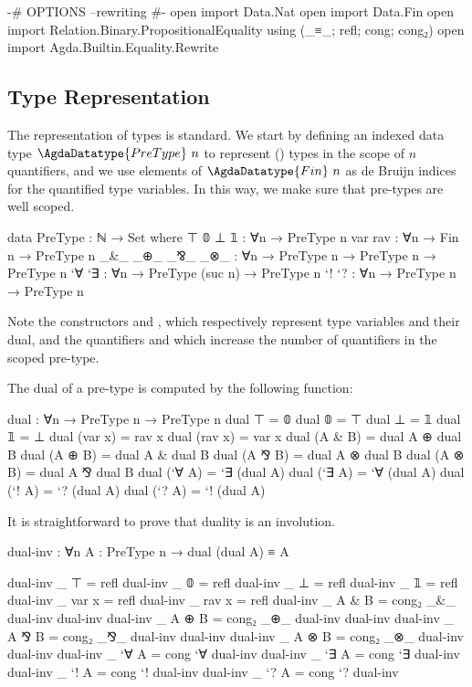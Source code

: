 \begin{code}[hide]
{-# OPTIONS --rewriting #-}
open import Data.Nat
open import Data.Fin
open import Relation.Binary.PropositionalEquality using (_≡_; refl; cong; cong₂)
open import Agda.Builtin.Equality.Rewrite
\end{code}

\subsection{Type Representation}
\label{sec:type-agda}

The representation of types is standard. We start by defining an indexed data
type $\AgdaDatatype{PreType}~n$ to represent (\LCC) types in the scope of $n$
quantifiers, and we use elements of $\AgdaDatatype{Fin}~n$ as de Bruijn indices
for the quantified type variables. In this way, we make sure that pre-types are
well scoped.

\begin{code}
data PreType : ℕ → Set where
  ⊤ 𝟘 ⊥ 𝟙          : ∀{n} → PreType n
  var rav          : ∀{n} → Fin n → PreType n
  _&_ _⊕_ _⅋_ _⊗_  : ∀{n} → PreType n → PreType n → PreType n
  `∀ `∃            : ∀{n} → PreType (suc n) → PreType n
  `! `?            : ∀{n} → PreType n → PreType n
\end{code}

Note the constructors  and
, which respectively represent type variables and
their dual, and the quantifiers  and
 which increase the number of quantifiers in the
scoped pre-type.

The dual of a pre-type is computed by the following function:

\begin{code}
dual : ∀{n} → PreType n → PreType n
dual ⊤        = 𝟘
dual 𝟘        = ⊤
dual ⊥        = 𝟙
dual 𝟙        = ⊥
dual (var x)  = rav x
dual (rav x)  = var x
dual (A & B)  = dual A ⊕ dual B
dual (A ⊕ B)  = dual A & dual B
dual (A ⅋ B)  = dual A ⊗ dual B
dual (A ⊗ B)  = dual A ⅋ dual B
dual (`∀ A)   = `∃ (dual A)
dual (`∃ A)   = `∀ (dual A)
dual (`! A)   = `? (dual A)
dual (`? A)   = `! (dual A)
\end{code}

It is straightforward to prove that duality is an involution.

\begin{code}
dual-inv : ∀{n} {A : PreType n} → dual (dual A) ≡ A
\end{code}
\begin{code}[hide]
dual-inv {_} {⊤} = refl
dual-inv {_} {𝟘} = refl
dual-inv {_} {⊥} = refl
dual-inv {_} {𝟙} = refl
dual-inv {_} {var x} = refl
dual-inv {_} {rav x} = refl
dual-inv {_} {A & B} = cong₂ _&_ dual-inv dual-inv
dual-inv {_} {A ⊕ B} = cong₂ _⊕_ dual-inv dual-inv
dual-inv {_} {A ⅋ B} = cong₂ _⅋_ dual-inv dual-inv
dual-inv {_} {A ⊗ B} = cong₂ _⊗_ dual-inv dual-inv
dual-inv {_} {`∀ A} = cong `∀ dual-inv
dual-inv {_} {`∃ A} = cong `∃ dual-inv
dual-inv {_} {`! A} = cong `! dual-inv
dual-inv {_} {`? A} = cong `? dual-inv
\end{code}

